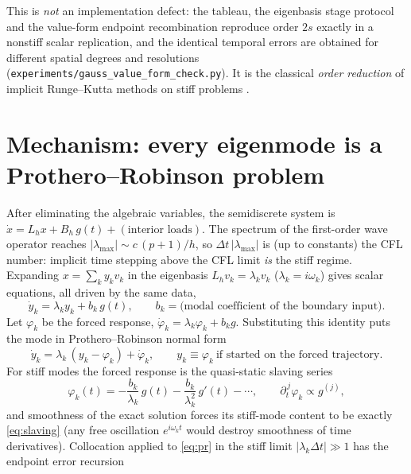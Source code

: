 \documentclass[11pt,a4paper]{article}
\newcommand{\dt}{\Delta t}
\begin{document}
This is \emph{not} an implementation defect: the tableau, the eigenbasis stage
protocol and the value-form endpoint recombination reproduce order $2s$ exactly
in a nonstiff scalar replication, and the identical temporal errors are obtained
for different spatial degrees and resolutions
(\texttt{experiments/gauss\_value\_form\_check.py}). It is the classical
\emph{order reduction} of implicit Runge--Kutta methods on stiff problems
\cite{prothero,hw2,ssvh}.

\section{Mechanism: every eigenmode is a Prothero--Robinson problem}

After eliminating the algebraic variables, the semidiscrete system is
$\dot x = L_h x + B_h\, g(t) + (\text{interior loads})$. The spectrum of the
first-order wave operator reaches $|\lambda_{\max}| \sim c\,(p{+}1)/h$, so
$\dt\,|\lambda_{\max}|$ is (up to constants) the CFL number: implicit time
stepping above the CFL limit \emph{is} the stiff regime. Expanding
$x = \sum_k y_k v_k$ in the eigenbasis $L_h v_k = \lambda_k v_k$
($\lambda_k = i\omega_k$) gives scalar equations, all driven by the same data,
\begin{equation*}
  \dot y_k = \lambda_k y_k + b_k\, g(t),
  \qquad b_k = \text{(modal coefficient of the boundary input)} .
\end{equation*}
Let $\varphi_k$ be the forced response, $\dot\varphi_k = \lambda_k\varphi_k +
b_k g$. Substituting this identity puts the mode in Prothero--Robinson normal
form \cite{prothero}
\begin{equation}
  \dot y_k = \lambda_k\,(y_k - \varphi_k) + \dot\varphi_k ,
  \qquad y_k \equiv \varphi_k \ \text{if started on the forced trajectory.}
  \label{eq:pr}
\end{equation}
For stiff modes the forced response is the quasi-static slaving series
\begin{equation}
  \varphi_k(t) = -\frac{b_k}{\lambda_k}\,g(t)
                 -\frac{b_k}{\lambda_k^2}\,g'(t) - \cdots ,
  \qquad \partial_t^{\,j}\varphi_k \propto g^{(j)} ,
  \label{eq:slaving}
\end{equation}
and smoothness of the exact solution forces its stiff-mode content to be exactly
\eqref{eq:slaving} (any free oscillation $e^{i\omega_k t}$ would destroy
smoothness of time derivatives). Collocation applied to \eqref{eq:pr} in the
stiff limit $|\lambda_k\dt| \gg 1$ has the endpoint error recursion
\end{document}
